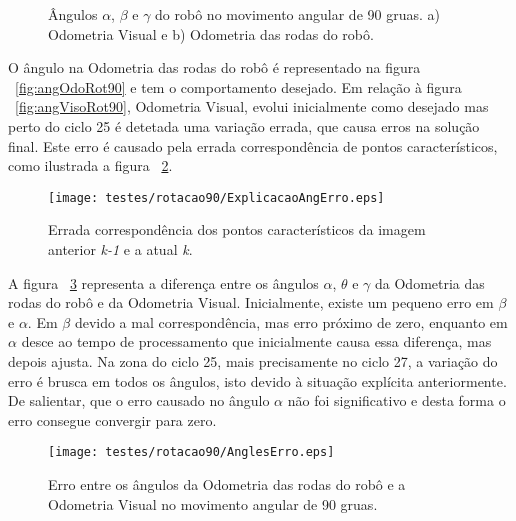 \begin{figure}[h!]
	\centering
	\qquad
	\caption{Ângulos $\alpha$, $\beta$ e $\gamma$ do robô  no movimento angular de 90 gruas. a) Odometria Visual e b) Odometria das rodas do robô.}
	\label{fig:angRot90}
\end{figure}


O ângulo na Odometria das rodas do robô é representado na figura ~\ref{fig:angOdoRot90} e tem o comportamento desejado. Em relação à figura ~\ref{fig:angVisoRot90}, Odometria Visual, evolui inicialmente como desejado mas perto do ciclo 25 é detetada uma variação errada, que causa erros na solução final. Este erro é causado pela errada correspondência de pontos característicos, como ilustrada a figura ~\ref{fig:ExplicAngErr}. 


\begin{figure}[h!]
	\begin{center}
		\leavevmode		
		\texttt{[image: testes/rotacao90/ExplicacaoAngErro.eps]}
		\caption{Errada correspondência dos pontos característicos da imagem anterior \textit{k-1} e a atual \textit{k}.}
		\label{fig:ExplicAngErr}
	\end{center}
\end{figure}


A figura ~\ref{fig:AnglesErro} representa a diferença entre os ângulos $\alpha$, $\theta$ e $\gamma$ da Odometria das rodas do robô e da Odometria Visual. Inicialmente, existe um pequeno erro em $\beta$ e $\alpha$. Em $\beta$ devido a mal correspondência, mas erro próximo de zero, enquanto em $\alpha$ desce ao tempo de processamento que inicialmente causa essa diferença, mas depois ajusta. Na zona do ciclo 25, mais precisamente no ciclo 27, a variação do erro é brusca em todos os ângulos, isto devido à situação explícita anteriormente. De salientar, que o erro causado no ângulo $\alpha$ não foi significativo e desta forma o erro consegue convergir para zero.



\begin{figure}[h!]
	\begin{center}
		\leavevmode		
		\texttt{[image: testes/rotacao90/AnglesErro.eps]}
		\caption{Erro entre os ângulos da Odometria das rodas do robô e a Odometria Visual no movimento angular de 90 gruas.}
		\label{fig:AnglesErro}
	\end{center}
\end{figure}




